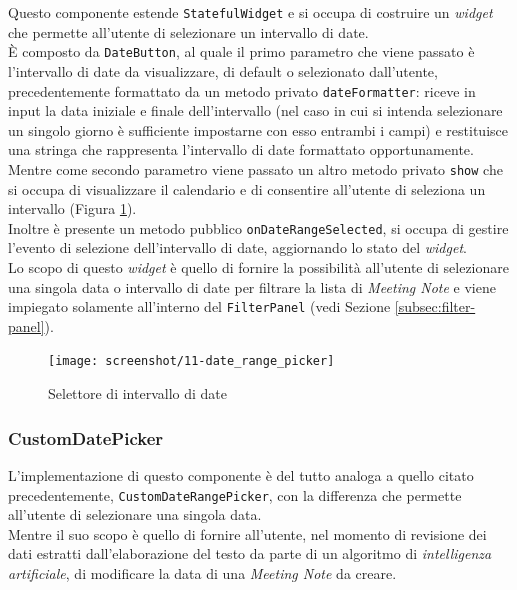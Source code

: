 Questo componente estende \lstinline{StatefulWidget} e si occupa di costruire un \emph{widget} che permette all'utente di selezionare un intervallo di date.\\
È composto da \lstinline{DateButton}, al quale il primo parametro che viene passato è l'intervallo di date da visualizzare, di default o selezionato dall'utente, precedentemente formattato da un metodo privato \lstinline{dateFormatter}: riceve in input la data iniziale e finale dell'intervallo (nel caso in cui si intenda selezionare un singolo giorno è sufficiente impostarne con esso entrambi i campi) e restituisce una stringa che rappresenta l'intervallo di date formattato opportunamente.\\
Mentre come secondo parametro viene passato un altro metodo privato \lstinline{show} che si occupa di visualizzare il calendario e di consentire all'utente di seleziona un intervallo (Figura \ref{fig:date-range-picker}). \\
Inoltre è presente un metodo pubblico \lstinline{onDateRangeSelected}, si occupa di gestire l'evento di selezione dell'intervallo di date, aggiornando lo stato del \emph{widget}. \\
Lo scopo di questo \emph{widget} è quello di fornire la possibilità all'utente di selezionare una singola data o intervallo di date per filtrare la lista di \emph{Meeting Note} e viene impiegato solamente all'interno del \lstinline{FilterPanel} (vedi Sezione \ref{subsec:filter-panel}).

\begin{figure}[!h] 
    \centering 
    \texttt{[image: screenshot/11-date\_range\_picker]} 
    \caption{Selettore di intervallo di date}
    \label{fig:date-range-picker}
\end{figure}

\subsubsection*{CustomDatePicker}
\label{subsubsec:custom-date-picker}

L'implementazione di questo componente è del tutto analoga a quello citato precedentemente, \lstinline{CustomDateRangePicker}, con la differenza che permette all'utente di selezionare una singola data.\\
Mentre il suo scopo è quello di fornire all'utente, nel momento di revisione dei dati estratti dall'elaborazione del testo da parte di un algoritmo di \emph{intelligenza artificiale}, di modificare la data di una \emph{Meeting Note} da creare.

